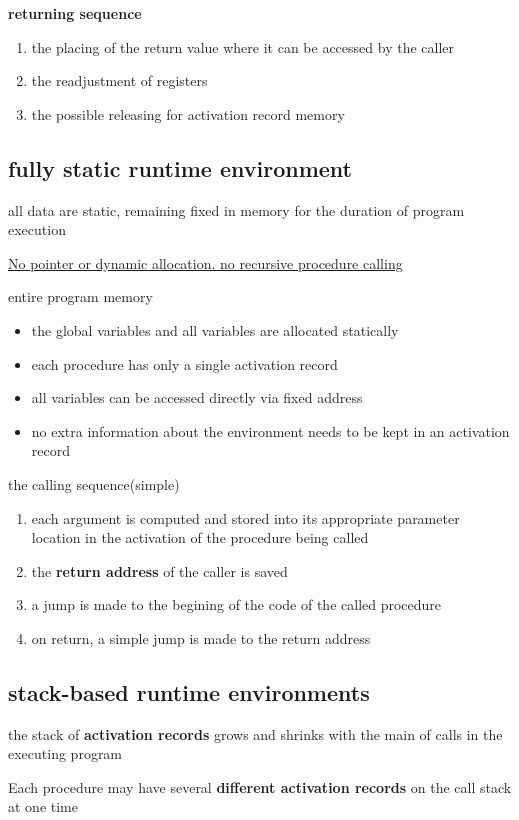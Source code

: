 \documentclass[11pt]{article}
\begin{document}
\textbf{returning sequence}
\begin{enumerate}
\item the placing of the return value where it can be accessed by the caller
\item the readjustment of registers
\item the possible releasing for activation record memory
\end{enumerate}
\subsection{fully static runtime environment}
\label{sec:org3cfcbf4}
all data are static, remaining fixed in memory for the duration of program execution

\uline{No pointer or dynamic allocation. no recursive procedure calling}

entire program memory
\begin{itemize}
\item the global variables and all variables are allocated statically
\item each procedure has only a single activation record
\item all variables can be accessed directly via fixed address
\item no extra information about the environment needs to be kept in an
activation record
\end{itemize}

the calling sequence(simple)
\begin{enumerate}
\item each argument is computed and stored into its appropriate parameter location
in the activation of the procedure being called
\item the \textbf{return address} of the caller is saved
\item a jump is made to the begining of the code of the called procedure
\item on return, a simple jump is made to the return address
\end{enumerate}
\subsection{stack-based runtime environments}
\label{sec:org45de23e}
the stack of \textbf{activation records} grows and shrinks with the main of calls in
the executing program

Each procedure may have several \textbf{different activation records} on the call
stack at one time
\end{document}
